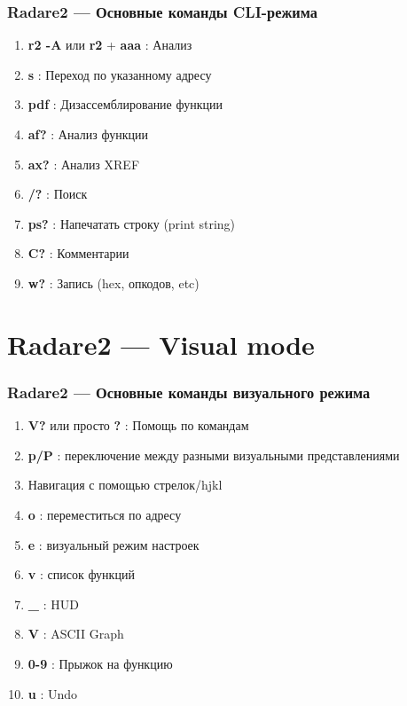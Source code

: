 \documentclass[10pt,pdf,utf8,english,compress,hyperref={unicode}]{beamer}
\begin{document}
\begin{frame}[fragile]
  \frametitle{Radare2 — Основные команды CLI-режима}
  \begin{enumerate}
   \item \alert{\bf{r2 -A}} или \alert{\bf{r2}} + \alert{\bf{aaa}} : Анализ
   \item \alert{\bf{s}} : Переход по указанному адресу
   \item \alert{\bf{pdf}} : Дизассемблирование функции
   \item \alert{\bf{af?}} : Анализ функции
   \item \alert{\bf{ax?}} : Анализ XREF
   \item \alert{\bf{/?}} : Поиск
   \item \alert{\bf{ps?}} : Напечатать строку (print string)
   \item \alert{\bf{C?}} : Комментарии
   \item \alert{\bf{w?}} : Запись (hex, опкодов, etc)
 \end{enumerate}
\end{frame}

\section{Radare2 — Visual mode}
\begin{frame}[fragile]
  \frametitle{Radare2 — Основные команды визуального режима}
  \begin{enumerate}
  \item \alert{\bf{V?}} или просто \alert{\bf{?}} : Помощь по командам
  \item \alert{\bf{p/P}} : переключение между разными визуальными представлениями
  \item Навигация с помощью стрелок/hjkl
  \item \alert{\bf{o}} : переместиться по адресу
  \item \alert{\bf{e}} : визуальный режим настроек
  \item \alert{\bf{v}} : список функций
  \item \alert{\bf{\_}} : HUD
  \item \alert{\bf{V}} : ASCII Graph
  \item \alert{\bf{0-9}} : Прыжок на функцию
  \item \alert{\bf{u}} : Undo
 \end{enumerate}
\end{frame}
\end{document}
